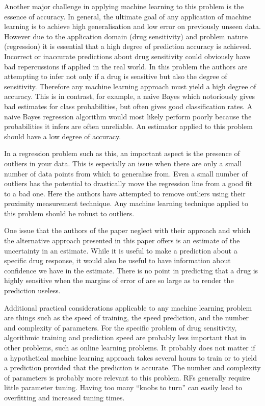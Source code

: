 \documentclass[journal]{IEEEtran}
\begin{document}
Another major challenge in applying machine learning to this problem is the essence of accuracy. In general, the ultimate goal of any application of machine learning is to achieve high generalisation and low error on previously unseen data. However due to the application domain (drug sensitivity) and problem nature (regression) it is essential that a high degree of prediction accuracy is achieved. Incorrect or inaccurate predictions about drug sensitivity could obviously have bad repercussions if applied in the real world. In this problem the authors are attempting to infer not only if a drug is sensitive but also the degree of sensitivity. Therefore any machine learning approach must yield a high degree of accuracy. This is in contrast, for example, a naive Bayes which notoriously gives bad estimates for class probabilities, but often gives good classification rates. A naive Bayes regression algorithm would most likely perform poorly because the probabilities it infers are often unreliable. An estimator applied to this problem should have a low degree of accuracy.

In a regression problem such as this, an important aspect is the presence of outliers in your data. This is especially an issue when there are only a small number of data points from which to generalise from. Even a small number of outliers has the potential to drastically move the regression line from a good fit to a bad one. Here the authors have attempted to remove outliers using their proximity measurement technique. Any machine learning technique applied to this problem should be robust to outliers.

One issue that the authors of the paper neglect with their approach and which the alternative approach presented in this paper offers is an estimate of the uncertainty in an estimate. While it is useful to make a prediction about a specific drug response, it would also be useful to have information about confidence we have in the estimate. There is no point in predicting that a drug is highly sensitive when the margins of error of are so large as to render the prediction useless.

Additional practical considerations applicable to any machine learning problem are things such as the speed of training, the speed prediction, and the number and complexity of parameters. For the specific problem of drug sensitivity, algorithmic training and prediction speed are probably less important that in other problems, such as online learning problems. It probably does not matter if a hypothetical machine learning approach takes several hours to train or to yield a prediction provided that the prediction is accurate. The number and complexity of parameters is probably more relevant to this problem. RFs generally require little parameter tuning. Having too many ``knobs to turn'' can easily lead to overfitting and increased tuning times.
\end{document}
